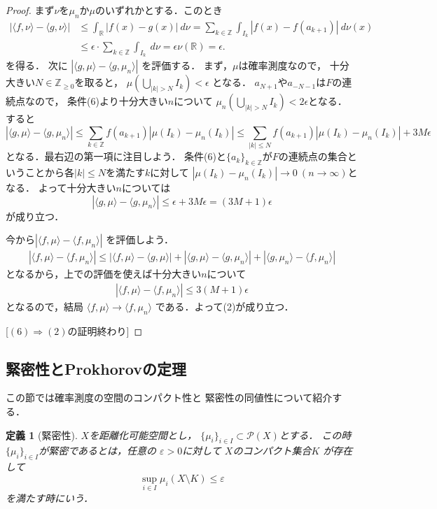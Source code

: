 \documentclass[leqno, a4paper, 12pt]{jsarticle}
\newtheorem{df}[thm]{定義}
\newcommand{\To}{\Longrightarrow}
\newcommand{\zz}{\mathbb{Z}}
\newcommand{\rr}{\mathbb{R}}
\newcommand{\ep}{\varepsilon}
\begin{document}
\begin{proof}
まず$\nu$を$\mu_{n}$か$\mu$のいずれかとする．このとき
\begin{align*}
|\langle f, \nu \rangle - 
\langle g, \nu \rangle |
&\le 
\int_{\rr}|f(x)-g(x)|\ d\nu=
\sum_{k\in \zz}\int_{I_{k}}|f(x)-f(a_{k+1})|\ d\nu(x)\\
&\le 
\epsilon \cdot \sum_{k\in \zz}\int_{I_{k}} \ d\nu
=\epsilon\nu(\rr)=\epsilon. 
\end{align*}
を得る．
次に
$|\langle g, \mu \rangle - 
\langle g, \mu_{n} \rangle |$
を評価する．
まず，$\mu$は確率測度なので，
十分大きい$N\in \zz_{\ge 0}$を取ると，
$\mu(\bigcup_{|k|>N}I_{k})<\epsilon$
となる．
$a_{N+1}$や$a_{-N-1}$は$F$の連続点なので，
条件(6)より十分大きい$n$について
$\mu_{n}(\bigcup_{|k|>N}I_{k})<2\epsilon$となる．
すると
\[
|\langle g, \mu \rangle - 
\langle g, \mu_{n} \rangle |
\le 
\sum_{k\in \zz}f(a_{k+1})|\mu(I_{k})-\mu_{n}(I_{k})|
\le \sum_{|k|\le N}f(a_{k+1})|\mu(I_{k})-\mu_{n}(I_{k})|
+3M\epsilon
\]
となる．最右辺の第一項に注目しよう．
条件(6)と$\{a_{k}\}_{k\in \zz}$が$F$の連続点の集合ということから各$|k|\le N$を満たす$k$に対して
$|\mu(I_{k})-\mu_{n}(I_{k})|\to 0\  (n\to \infty)$となる．
よって十分大きい$n$については
\[
|\langle g, \mu \rangle - 
\langle g, \mu_{n} \rangle |
\le \epsilon+3M\epsilon=(3M+1)\epsilon
\]
が成り立つ．

今から$|\langle f, \mu \rangle - 
\langle f, \mu_{n} \rangle |$
を評価しよう．
\begin{align*}
|\langle f, \mu \rangle - 
\langle f, \mu_{n} \rangle |
\le 
|\langle f, \mu \rangle - 
\langle g, \mu \rangle |
+
|\langle g, \mu \rangle - 
\langle g, \mu_{n} \rangle |
+
|\langle g, \mu_{n} \rangle - 
\langle f, \mu_{n} \rangle |
\end{align*}
となるから，上での評価を使えば十分大きい$n$について
\begin{align*}
|\langle f, \mu \rangle - 
\langle f, \mu_{n} \rangle |
\le 3(M+1)\epsilon
\end{align*}
となるので，結局
$\langle f, \mu \rangle \to 
\langle f, \mu_{n} \rangle $
である．よって(2)が成り立つ．

[$(6)\To (2)$の証明終わり]
\end{proof}




\subsection{緊密性とProkhorovの定理}
この節では確率測度の空間のコンパクト性と
緊密性の同値性について紹介する．
\begin{df}[緊密性]
$X$を距離化可能空間とし，
$\{\mu_i\}_{i\in I}\subset \mathcal{P}(X)$とする．
この時
$\{\mu_i\}_{i\in I}$が緊密であるとは，任意の
$\ep>0$に対して
$X$のコンパクト集合$K$
が存在して
\[
\sup_{i\in I}\mu_i(X\setminus K)\le \ep
\]
を満たす時にいう．
\end{df}
\end{document}
